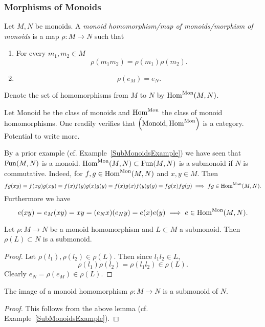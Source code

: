 \subsubsection{Morphisms of Monoids}
\begin{definition}
    Let $M,N$ be monoids. A \textit{monoid homomorphism/map of monoids/morphism of monoids} is a map $\rho : M \rightarrow N$ such that 
    \begin{enumerate}
        \item For every $m_1,m_2\in M$
        $$\rho(m_1m_2)=\rho(m_1)\rho(m_2).$$
        \item 
        $$\rho(e_M) = e_N.$$
    \end{enumerate}
    Denote the set of homomorphisms from $M$ to $N$ by $\mathrm{Hom}^{\text{Mon}}(M,N)$.
\end{definition}
\begin{remark}
    Let $\mathrm{Monoid}$ be the class of monoids and $\mathrm{Hom}^{\mathrm{Mon}}$ the class of monoid homomorphisms. One readily verifies that $\left(\mathrm{Monoid}, \mathrm{Hom}^\mathrm{Mon}\right)$ is a category. {\LARGE Potential to write more}. 
\end{remark}
\begin{remark}
    By a prior example (cf. Example~\ref{SubMonoidsExample}) we have seen that $\mathrm{Fun}(M,N)$ is a monoid. $\mathrm{Hom}^{\mathrm{Mon}}(M,N)\subset \mathrm{Fun}(M,N)$ is a submonoid if $N$ is commutative. Indeed, for $f,g\in \mathrm{Hom}^{\mathrm{Mon}}(M,N)$ and $x,y\in M$. Then 
    $$fg(xy)=f(xy)g(xy) = f(x)f(y)g(x)g(y) = f(x)g(x)f(y)g(y)=fg(x)fg(y)\implies fg\in \mathrm{Hom}^\mathrm{Mon}(M,N).$$
    Furthermore we have 
    $$e(xy)=e_M(xy)=xy=(e_Nx)(e_Ny)=e(x)e(y)\implies e\in \mathrm{Hom}^\mathrm{Mon}(M,N).$$
\end{remark}
\begin{lemma}\label{MonoidHomomorphismImageOfSubmonoidIsSubmonoid}
    Let $\rho : M\rightarrow N$ be a monoid homomorphism and $L\subset M$ a submonoid. Then $\rho(L) \subset N$ is a submonoid.   
\end{lemma}
\begin{proof}
    Let $\rho(l_1),\rho(l_2)\in \rho(L)$. Then since $l_1l_2\in L$,
    $$\rho(l_1)\rho(l_2)=\rho(l_1l_2)\in \rho(L).$$
    Clearly $e_N = \rho(e_M)\in \rho(L)$. 
\end{proof}
\begin{corollary}\label{ImageOfMonoidHomomorphismIsSubmonoid}
    The image of a monoid homomorphism $\rho:M\rightarrow N$ is a submonoid of $N$.
\end{corollary}
\begin{proof}
    This follows from the above lemma (cf. Example~\ref{SubMonoidsExample}). 
\end{proof}
